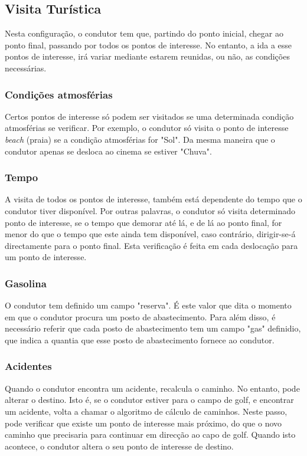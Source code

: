 \documentclass[15pt,a4paper]{article}
\begin{document}
\subsection{Visita Turística}
Nesta configuração, o condutor tem que, partindo do ponto inicial, chegar ao ponto final, passando por todos os pontos de interesse. No entanto, a ida a esse pontos de interesse, irá variar mediante estarem reunidas, ou não, as condições necessárias. 

\subsubsection{Condições atmosférias}
Certos pontos de interesse só podem ser visitados se uma determinada condição atmosférias se verificar. Por exemplo, o condutor só visita o ponto de interesse \textit{beach} (praia) se a condição atmosférias for "Sol". Da mesma maneira que o condutor apenas se desloca ao cinema se estiver "Chuva".

\subsubsection{Tempo}
A visita de todos os pontos de interesse, também está dependente do tempo que o condutor tiver disponível. Por outras palavras, o condutor só visita determinado ponto de interesse, se o tempo que demorar até lá, e de lá ao ponto final, for menor do que o tempo que este ainda tem disponível, caso contrário, dirigir-se-á directamente para o ponto final. Esta verificação é feita em cada deslocação para um ponto de interesse.

\subsubsection{Gasolina}
O condutor tem definido um campo "reserva". É este valor que dita o momento em que o condutor procura um posto de abastecimento. Para além disso, é necessário referir que cada posto de abastecimento tem um campo "gas" definidio, que indica a quantia que esse posto de abastecimento fornece ao condutor.

\subsubsection{Acidentes}
Quando o condutor encontra um acidente, recalcula o caminho. No entanto, pode alterar o destino. Isto é, se o condutor estiver para o campo de golf, e encontrar um acidente, volta a chamar o algoritmo de cálculo de caminhos. Neste passo, pode verificar que existe um ponto de interesse mais próximo, do que o novo caminho que precisaria para continuar em direcção ao capo de golf. Quando isto acontece, o condutor altera o seu ponto de interesse de destino.
\end{document}
